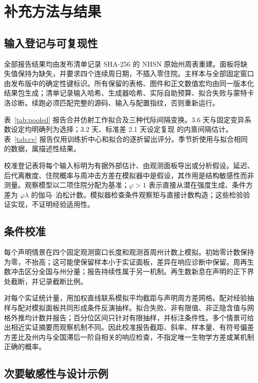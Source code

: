 \section{补充方法与结果}
\label{app:supplement}

\subsection{输入登记与可复现性}
\label{app:inputs}

全部报告结果均由发布清单记录 SHA-256 的 NHSN 原始州周表重建。面板将缺失值保持为缺失，并要求四个连续周日期，不插入零住院。主样本与全部固定窗口由发布版中的确定性键标识。所有保留的表格、图件和正文数值宏均由同一版本化结果包生成；清单记录输入哈希、生成器哈希、实际自助预算、拟合失败与蒙特卡洛诊断。续跑必须匹配完整的源码、输入与配置指纹，否则重新运行。

表~\ref{tab:pooled} 报告合并仿射工作拟合及三种代际间隔变换。3.6 天与固定变异系数设定均明确列为选择；3.2 天、标准差 2.1 天设定复现 \citet{chan2025estimating} 的内禀间隔估计。表~\ref{tab:cv} 报告仅用训练折中心和拟合的逐折留出评分。季节折使用与拟合相同的数据，属描述性结果。

校准登记表将每个输入标明为有据外部估计、由观测面板导出或分析假设。延迟、后代离散度、住院概率与周冲击方差在模拟器中是假设，其作用是结构敏感性而非测量。观察模型以二项住院分配为基准；$\varphi>1$ 表示直接从潜在强度生成、条件方差为 $\varphi\lambda$ 的伽马--泊松计数。模拟器检查条件观察矩与直接计数构造；这些检验验证实现，不证明经验适用性。

\subsection{条件校准}
\label{app:calibration}

每个声明情景在四个固定观测窗口长度和观测首周州计数上模拟。初始零计数保持为零，不抬高；这可能使保留样本小于实证面板，差异在响应诊断中保留。周再生数冲击区分全国与州分量；报告持续性属于另一机制。再生数新息在声明的正下界处截断，并记录截断比例。

对每个实证统计量，用加权直线联系模拟平均截距与声明周方差网格。配对经验抽样与配对模拟面板共同形成条件反演抽样。拟合失败、非有限值、非正隐含值与网格外推均计数并报告；百分位区间只针对有限抽样，并标注条件性。多个情景可给出相近实证摘要而观察机制不同。因此校准报告截距、斜率、样本量、有符号偏差方差比及州内与全国滞后一阶自相关的响应检查，不指定唯一生物学方差或某机制正确的概率。

\subsection{次要敏感性与设计示例}
\label{app:secondary}

